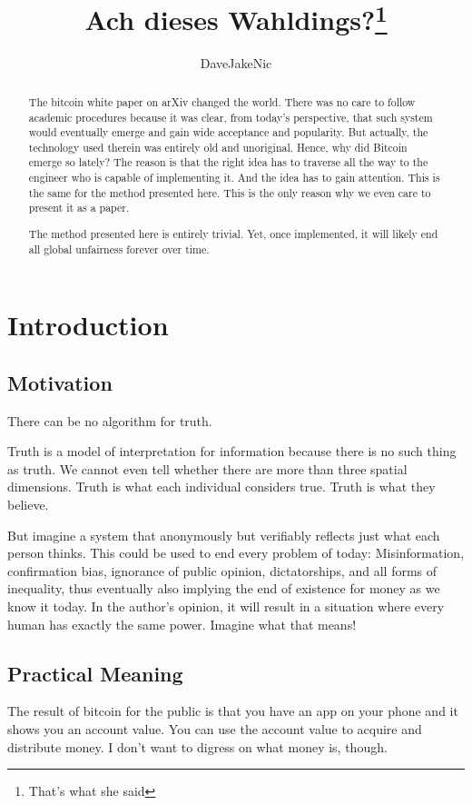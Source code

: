 \documentclass{article}
\title{Ach dieses Wahldings?\footnote{That's what she said}}
\author{DaveJakeNic}
\theoremstyle{definition}
\begin{document}
	
	\maketitle
	
	\begin{abstract}
		The bitcoin white paper on arXiv changed the world. There was no care to follow academic procedures because it was clear, from today's perspective, that such system would eventually emerge and gain wide acceptance and popularity. But actually, the technology used therein was entirely old and unoriginal. Hence, why did Bitcoin emerge so lately? The reason is that the right idea has to traverse all the way to the engineer who is capable of implementing it. And the idea has to gain attention. This is the same for the method presented here. This is the only reason why we even care to present it as a paper.
		
		The method presented here is entirely trivial. Yet, once implemented, it will likely end all global unfairness forever over time.
	\end{abstract}

\tableofcontents
	
	\section{Introduction}
	
	\subsection{Motivation}
	There can be no algorithm for truth.
	
	Truth is a model of interpretation for information because there is no such thing as truth. We cannot even tell whether there are more than three spatial dimensions. Truth is what each individual considers true. Truth is what they believe.
	
	But imagine a system that anonymously but verifiably reflects just what each person thinks. This could be used to end every problem of today: Misinformation, confirmation bias, ignorance of public opinion, dictatorships, and all forms of inequality, thus eventually also implying the end of existence for money as we know it today. In the author's opinion, it will result in a situation where every human has exactly the same power. Imagine what that means!
	
	\subsection{Practical Meaning}
	The result of bitcoin for the public is that you have an app on your phone and it shows you an account value. You can use the account value to acquire and distribute money. I don't want to digress on what money is, though.
	
\end{document}
